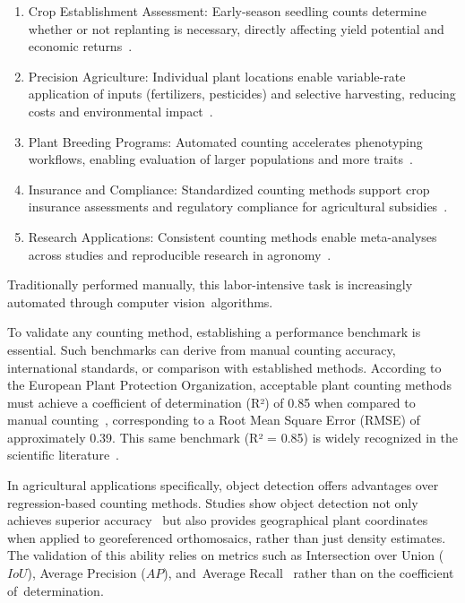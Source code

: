 \documentclass[12pt,a4paper,oneside]{report}
\begin{document}
\begin{enumerate}
    \item Crop Establishment Assessment: Early-season seedling counts determine whether or not replanting is necessary, 
    directly affecting yield potential and economic returns~\cite{blandinoeffetto2016}.
    \item Precision Agriculture: Individual plant locations enable variable-rate application of inputs (fertilizers, 
    pesticides) and selective harvesting, reducing costs and environmental impact~\cite{10287390}.
    \item Plant Breeding Programs: Automated counting accelerates phenotyping workflows, enabling evaluation of 
    larger populations and more traits~\cite{Saatkamp2019AResearchAF}.
    \item Insurance and Compliance: Standardized counting methods support crop insurance assessments and regulatory 
    compliance for agricultural subsidies~\cite{rs13051030}.
    \item Research Applications: Consistent counting methods enable meta-analyses across studies and reproducible
    research in agronomy~\cite{PP13332024}.
\end{enumerate}

Traditionally performed manually, this labor-intensive
task is increasingly automated through computer vision~algorithms.

To validate any counting method, establishing a performance benchmark is essential.
Such benchmarks can derive from manual counting accuracy, international standards,
or comparison with established methods. According to the European Plant Protection
Organization, acceptable plant counting methods must achieve a coefficient of 
determination (R²) of 0.85 when compared to manual counting~\cite{PP13332024}, 
corresponding to a Root Mean Square Error (RMSE) of approximately 0.39. This same
benchmark (R² = 0.85) is widely recognized in the scientific literature~\cite{zouMaizeTasselsDetection2020}.

In agricultural applications specifically, object detection offers advantages over
regression-based counting methods. Studies show object detection not only achieves
superior accuracy~\cite{zouMaizeTasselsDetection2020} but also provides geographical
plant coordinates when applied to georeferenced orthomosaics, rather than just density
estimates. 
The validation of this ability relies on metrics such as Intersection over Union ({$IoU$}),
Average Precision ({$AP$}), and~Average Recall~\cite{linMicrosoftCOCOCommon2015} rather than on
the coefficient of~determination. 
\end{document}
